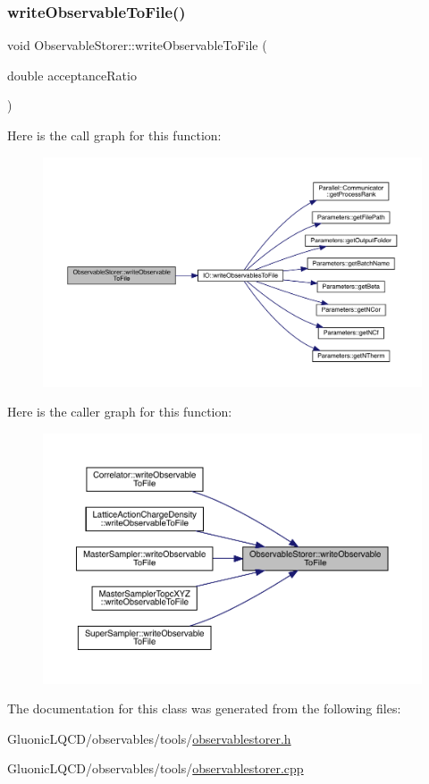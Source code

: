 \subsubsection{\texorpdfstring{writeObservableToFile()}{writeObservableToFile()}}
{\footnotesize\ttfamily void Observable\+Storer\+::write\+Observable\+To\+File (\begin{DoxyParamCaption}\item[{double}]{acceptance\+Ratio }\end{DoxyParamCaption})}

Here is the call graph for this function\+:\nopagebreak
\begin{figure}[H]
\begin{center}
\leavevmode
\includegraphics[width=350pt]{class_observable_storer_a146f9acb8a0a2ce15782d26bdc4f0bf9_cgraph}
\end{center}
\end{figure}
Here is the caller graph for this function\+:\nopagebreak
\begin{figure}[H]
\begin{center}
\leavevmode
\includegraphics[width=350pt]{class_observable_storer_a146f9acb8a0a2ce15782d26bdc4f0bf9_icgraph}
\end{center}
\end{figure}


The documentation for this class was generated from the following files\+:\begin{DoxyCompactItemize}
\item 
Gluonic\+L\+Q\+C\+D/observables/tools/\mbox{\hyperlink{observablestorer_8h}{observablestorer.\+h}}\item 
Gluonic\+L\+Q\+C\+D/observables/tools/\mbox{\hyperlink{observablestorer_8cpp}{observablestorer.\+cpp}}\end{DoxyCompactItemize}
